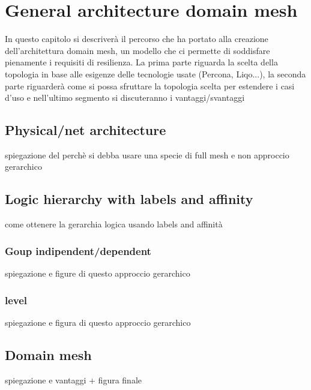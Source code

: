 \chapter{General architecture domain mesh}
In questo capitolo si descriverà il percorso che ha portato alla creazione dell'architettura domain mesh, un modello che ci permette di soddisfare pienamente i requisiti di resilienza. La prima parte riguarda la scelta della topologia in base alle esigenze delle tecnologie usate (Percona, Liqo...), la seconda parte riguarderà come si possa sfruttare la topologia scelta per estendere i casi d'uso e nell'ultimo segmento si discuteranno i vantaggi/svantaggi

\section{Physical/net architecture}
spiegazione del perchè si debba usare una specie di full mesh e non approccio gerarchico

\section{Logic hierarchy with labels and affinity}
come ottenere la gerarchia logica usando labels and  affinità

\subsection{Goup indipendent/dependent}
spiegazione e figure di questo approccio gerarchico

\subsection{level}
spiegazione e figura di questo approccio gerarchico

\section{Domain mesh}
spiegazione e vantaggi + figura finale
